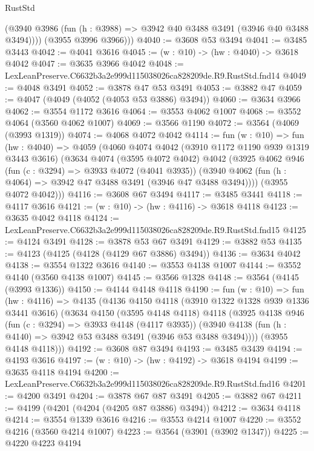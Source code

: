 \begin{lexlean}{RustStd}
\begin{coremodule}
          (@3940 @3986 (fun (h : @3988) => @3942 @40 @3488 @3491 (@3946 @40 @3488 @3494))))
        (@3955 @3996 @3966)))
@4040 := @3608 @53 @3494
@4041 := @3485 @3443
@4042 := @4041 @3616
@4045 := (w : @10) -> (hw : @4040) -> @3618 @4042
@4047 := @3635 @3966 @4042
@4048 := LexLeanPreserve.C6632b3a2e999d115038026ca828209de.R9.RustStd.fnd14
@4049 := @4048 @3491
@4052 := @3878 @47 @53 @3491
@4053 := @3882 @47
@4059 := @4047 (@4049 (@4052 (@4053 @53 @3886) @3494))
@4060 := @3634 @3966
@4062 := @3554 @1172 @3616
@4064 := @3553 @4062 @1007
@4068 := @3552 @4064 (@3560 @4062 @1007)
@4069 := @3566 @1190
@4072 := @3564 (@4069 (@3993 @1319))
@4074 := @4068 @4072 @4042
@4114 := fun (w : @10) =>
  fun (hw : @4040) =>
  @4059
    (@4060
      @4074
      @4042
      (@3910 @1172 @1190 @939 @1319 @3443 @3616)
      (@3634
        @4074
        (@3595 @4072 @4042)
        @4042
        (@3925
          @4062
          @946
          (fun (c : @3294) => @3933 @4072 (@4041 @3935))
          (@3940 @4062 (fun (h : @4064) => @3942 @47 @3488 @3491 (@3946 @47 @3488 @3494))))
        (@3955 @4072 @4042)))
@4116 := @3608 @67 @3494
@4117 := @3485 @3441
@4118 := @4117 @3616
@4121 := (w : @10) -> (hw : @4116) -> @3618 @4118
@4123 := @3635 @4042 @4118
@4124 := LexLeanPreserve.C6632b3a2e999d115038026ca828209de.R9.RustStd.fnd15
@4125 := @4124 @3491
@4128 := @3878 @53 @67 @3491
@4129 := @3882 @53
@4135 := @4123 (@4125 (@4128 (@4129 @67 @3886) @3494))
@4136 := @3634 @4042
@4138 := @3554 @1322 @3616
@4140 := @3553 @4138 @1007
@4144 := @3552 @4140 (@3560 @4138 @1007)
@4145 := @3566 @1328
@4148 := @3564 (@4145 (@3993 @1336))
@4150 := @4144 @4148 @4118
@4190 := fun (w : @10) =>
  fun (hw : @4116) =>
  @4135
    (@4136
      @4150
      @4118
      (@3910 @1322 @1328 @939 @1336 @3441 @3616)
      (@3634
        @4150
        (@3595 @4148 @4118)
        @4118
        (@3925
          @4138
          @946
          (fun (c : @3294) => @3933 @4148 (@4117 @3935))
          (@3940 @4138 (fun (h : @4140) => @3942 @53 @3488 @3491 (@3946 @53 @3488 @3494))))
        (@3955 @4148 @4118)))
@4192 := @3608 @87 @3494
@4193 := @3485 @3439
@4194 := @4193 @3616
@4197 := (w : @10) -> (hw : @4192) -> @3618 @4194
@4199 := @3635 @4118 @4194
@4200 := LexLeanPreserve.C6632b3a2e999d115038026ca828209de.R9.RustStd.fnd16
@4201 := @4200 @3491
@4204 := @3878 @67 @87 @3491
@4205 := @3882 @67
@4211 := @4199 (@4201 (@4204 (@4205 @87 @3886) @3494))
@4212 := @3634 @4118
@4214 := @3554 @1339 @3616
@4216 := @3553 @4214 @1007
@4220 := @3552 @4216 (@3560 @4214 @1007)
@4223 := @3564 (@3901 (@3902 @1347))
@4225 := @4220 @4223 @4194

\end{coremodule}
\end{lexlean}
